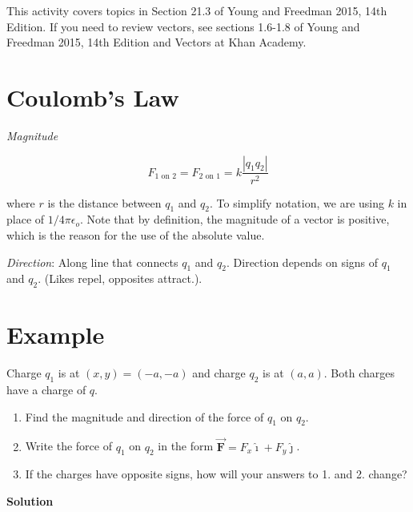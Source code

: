 \documentclass{article}
\renewcommand{\mbox}{\text}
\newcommand{\ihat}[0]{\hat{\boldsymbol{\imath}}}
\newcommand{\jhat}[0]{\hat{\boldsymbol{\jmath}}}
\newcommand{\bfvec}[1]{\vec{\mathbf{#1}}}
\begin{document}

This activity covers topics in Section 21.3 of Young and Freedman 2015, 14th Edition. If you need to review vectors, see sections 1.6-1.8 of Young and Freedman 2015, 14th Edition and  Vectors at Khan Academy.

\section{Coulomb's Law}

\emph{Magnitude}

\begin{equation}
F_{1\mbox{ on } 2}=F_{2\mbox{ on } 1}=k\frac{|q_1q_2|}{r^2}
\end{equation}

where $r$ is the distance between $q_1$ and $q_2$. To simplify notation, we are using $k$ in place of $1/4\pi\epsilon_o$. Note that by definition, the magnitude of a vector is positive, which is the reason for the use of the absolute value.

\emph{Direction}: Along line that connects $q_1$ and $q_2$. Direction depends on signs of $q_1$ and $q_2$. (Likes repel, opposites attract.).

\section{Example}

Charge $q_1$ is at $(x,y)=(-a,-a)$ and charge $q_2$ is at $(a, a)$. Both charges have a charge of $q$.

\begin{enumerate}

  \item Find the magnitude and direction of the force of $q_1$ on $q_2$.

  \item Write the force of $q_1$ on $q_2$ in the form $\bfvec{F}=F_x\ihat + F_y\jhat$.

  \item If the charges have opposite signs, how will your answers to 1. and 2. change?

\end{enumerate}

\textbf{Solution}
\end{document}
